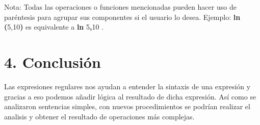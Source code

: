 \documentclass[10pt]{report}
\begin{document}
Nota: Todas las operaciones o funciones mencionadas pueden hacer uso de paréntesis para agrupar sus componentes si el usuario lo desea. Ejemplo: \textbf{ln} \textbf{(}5,10\textbf{)} es equivalente a \textbf{ln} 5\textbf{,}10 .

\section*{4. Conclusión}
Las expresiones regulares nos ayudan a entender la sintaxis de una expresión y gracias a eso podemos añadir lógica al resultado de dicha expresión. Así como se analizaron sentencias simples, con nuevos procedimientos se podrían realizar el analisis y obtener el resultado de operaciones más complejas. 
\end{document}

